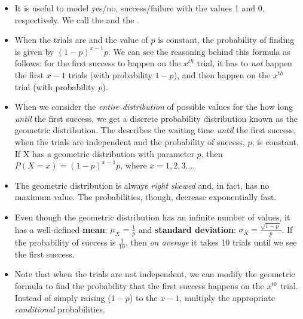 \begin{itemize}
\item It is useful to model yes/no, success/failure with the values 1 and 0, respectively. We call the and the .

\item When the trials are  and the value of $p$ is constant, the probability of finding  is given by $(1-p)^{x-1}p$.  We can see the reasoning behind this formula as follows:  for the first success to happen on the $x^{th}$ trial, it has to \emph{not} happen the first $x-1$ trials (with probability $1-p$), and then happen on the $x^{th}$ trial (with probability $p$).  

\item When we consider the \emph{entire distribution} of possible values for the how long \emph{until} the first success, we get a discrete probability distribution known as the geometric distribution. The  describes the waiting time \emph{until} the first success, when the trials are independent and the probability of success, $p$, is constant.  If X has a geometric distribution with parameter $p$, then $P(X=x)=(1-p)^{x-1}p$, where $x=1,2,3\dots$.

\item The geometric distribution is always \emph{right skewed} and, in fact, has no maximum value.  The probabilities, though, decrease exponentially fast.

\item Even though the geometric distribution has an infinite number of values, it has a well-defined \textbf{mean}: $\mu_{\scriptscriptstyle{X}}=\frac{1}{p}$ and \textbf{standard deviation}: $\sigma_{\scriptscriptstyle{X}} = \frac{\sqrt{1-p \ }}{p}$.  If the probability of success is $\frac{1}{10}$, then \emph{on average} it takes 10 trials until we see the first success.

\item Note that when the trials are not independent, we can modify the geometric formula to find the probability that the first success happens on the $x^{th}$ trial. Instead of simply raising ($1-p$) to the $x-1$, multiply the appropriate \emph{conditional} probabilities.

\end{itemize}



{}





